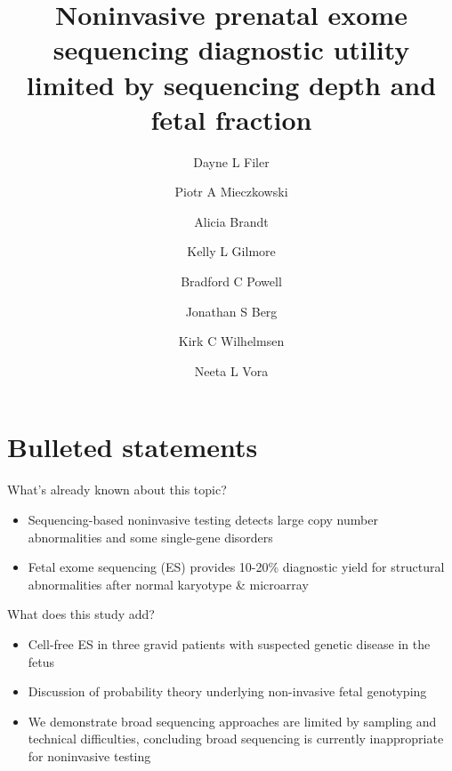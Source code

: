 \documentclass{article}\usepackage[]{graphicx}\usepackage[]{color}
\begin{document}
\title{Noninvasive prenatal exome sequencing diagnostic utility limited by sequencing depth and fetal fraction}

\author[1,2,*]{Dayne L Filer}
\author[1]{Piotr A Mieczkowski}
\author[1]{Alicia Brandt}
\author[3]{Kelly L Gilmore}
\author[1,2]{Bradford C Powell}
\author[1]{Jonathan S Berg}
\author[1,2,4]{Kirk C Wilhelmsen}
\author[1,3]{Neeta L Vora}
\date{}

\maketitle

\linenumbers

\section*{Bulleted statements}

What's already known about this topic?
\begin{itemize}
    \item Sequencing-based noninvasive testing detects large copy number abnormalities and some single-gene disorders
    \item Fetal exome sequencing (ES) provides 10-20\% diagnostic yield for structural abnormalities after normal karyotype \& microarray
\end{itemize}

What does this study add?
\begin{itemize}
    \item Cell-free ES in three gravid patients with suspected genetic disease in the fetus
    \item Discussion of probability theory underlying non-invasive fetal genotyping
    \item We demonstrate broad sequencing approaches are limited by sampling and technical difficulties, concluding broad sequencing is currently inappropriate for noninvasive testing
\end{itemize}
\end{document}
